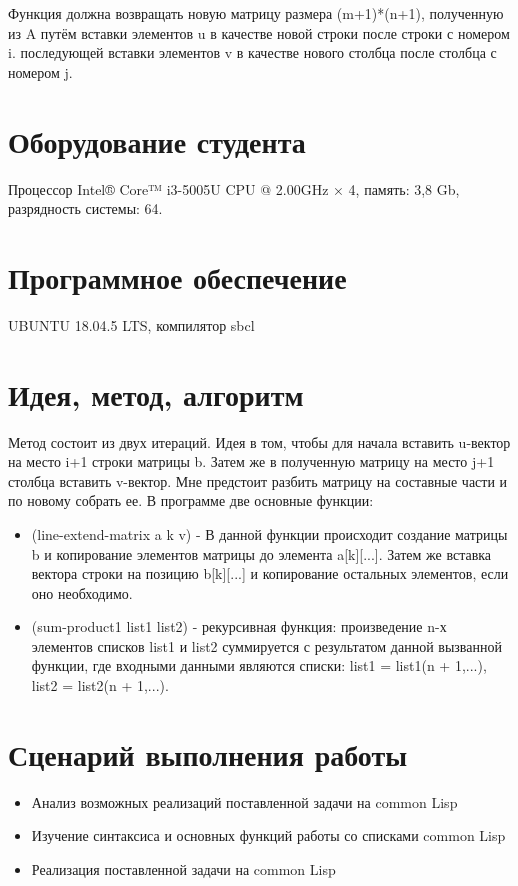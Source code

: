 \documentclass[12pt]{article}
\begin{document}
Функция должна возвращать новую матрицу размера (m+1)*(n+1), полученную из A путём вставки элементов u в качестве новой строки после строки с номером i. последующей вставки элементов v в качестве нового столбца после столбца с номером j.


\section{Оборудование студента}
Процессор Intel® Core™ i3-5005U CPU @ 2.00GHz × 4, память: 3,8 Gb, разрядность системы: 64.

\section{Программное обеспечение}
UBUNTU 18.04.5 LTS, компилятор sbcl

\section{Идея, метод, алгоритм}
Метод состоит из двух итераций. Идея в том, чтобы для начала вставить u-вектор на место i+1 строки матрицы b. Затем же в полученную матрицу на место j+1 столбца вставить v-вектор. Мне предстоит разбить матрицу на составные части и по новому собрать ее. В программе две основные функции:
\begin{itemize}
\setlength{\itemsep}{-1mm} %
\item (line-extend-matrix a k v) - В данной функции происходит создание матрицы b и копирование элементов матрицы до элемента a[k][...]. Затем же вставка вектора строки на позицию b[k][...] и копирование остальных элементов, если оно необходимо. 
\item (sum-product1 list1 list2) - рекурсивная функция: произведение n-х элементов списков  list1 и list2  суммируется с результатом данной вызванной функции, где входными данными являются списки: list1 = list1(n + 1,...), list2 = list2(n + 1,...).
\end{itemize}

\section{Сценарий выполнения работы}
\begin{itemize}
\setlength{\itemsep}{-1mm}
\item Анализ возможных реализаций поставленной задачи на common Lisp
\item Изучение синтаксиса и основных функций работы со списками common Lisp
\item Реализация поставленной задачи на common Lisp
\end{itemize}
\end{document}
